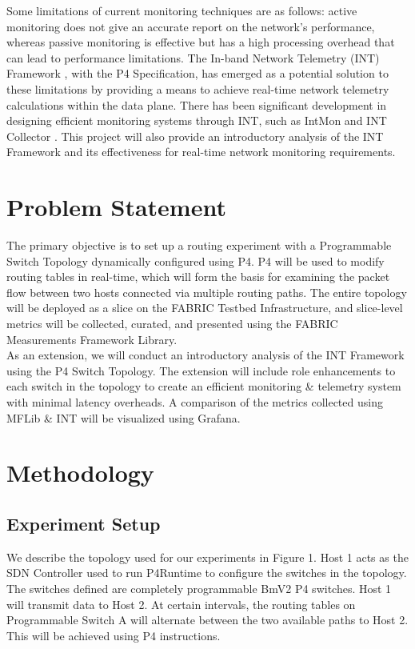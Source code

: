 \documentclass[conference]{IEEEtran}
\begin{document}
Some limitations of current monitoring techniques are as follows: active monitoring does not give an accurate report on the network's performance, whereas passive monitoring is effective but has a high processing overhead that can lead to performance limitations. The In-band Network Telemetry (INT) Framework \cite{b4}, with the P4 Specification, has emerged as a potential solution to these limitations by providing a means to achieve real-time network telemetry calculations within the data plane. There has been significant development in designing efficient monitoring systems through INT, such as IntMon \cite{b5} and INT Collector \cite{b6}. This project will also provide an introductory analysis of the INT Framework and its effectiveness for real-time network monitoring requirements.

\section{Problem Statement}
The primary objective is to set up a routing experiment with a Programmable Switch Topology dynamically configured using P4. P4 will be used to modify routing tables in real-time, which will form the basis for examining the packet flow between two hosts connected via multiple routing paths. The entire topology will be deployed as a slice on the FABRIC Testbed Infrastructure, and slice-level metrics will be collected, curated, and presented using the FABRIC Measurements Framework Library. \\

As an extension, we will conduct an introductory analysis of the INT Framework using the P4 Switch Topology. The extension will include role enhancements to each switch in the topology to create an efficient monitoring \& telemetry system with minimal latency overheads. A comparison of the metrics collected using MFLib \& INT will be visualized using Grafana.

\section{Methodology}
\subsection{Experiment Setup}
We describe the topology used for our experiments in Figure 1. Host 1 acts as the SDN Controller used to run P4Runtime to configure the switches in the topology. The switches defined are completely programmable BmV2 P4 switches. Host 1 will transmit data to Host 2. At certain intervals, the routing tables on Programmable Switch A will alternate between the two available paths to Host 2. This will be achieved using P4 instructions.
 
\end{document}

